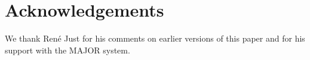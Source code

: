 \documentclass[conference]{IEEEtran}
\begin{document}






\section{Acknowledgements}                                                       
We thank Ren\'e Just for his comments on earlier versions of this paper and for his support with the MAJOR system.

\vspace*{-.125in}



\end{document}
